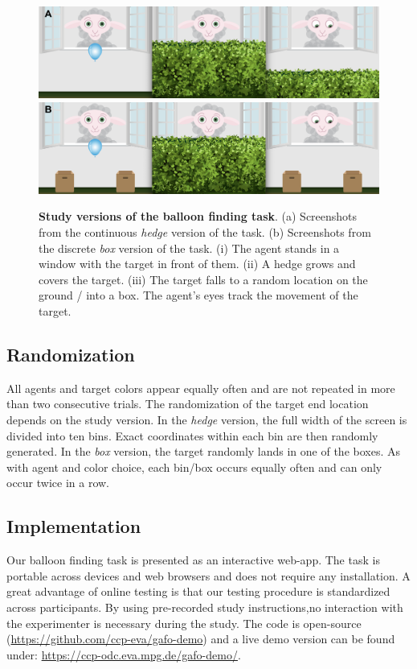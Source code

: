 \documentclass[
  english,
  man,floatsintext]{apa6}
\begin{document}
\begin{figure}
\includegraphics[width=1\linewidth]{../figures/gafo_hedge} \includegraphics[width=1\linewidth]{../figures/gafo_boxes} \caption{\textbf{Study versions of the balloon finding task}. (a) Screenshots from the continuous \emph{hedge} version of the task. (b) Screenshots from the discrete \emph{box} version of the task. (i) The agent stands in a window with the target in front of them. (ii) A hedge grows and covers the target. (iii) The target falls to a random location on the ground / into a box. The agent's eyes track the movement of the target.}\label{fig:fig1}
\end{figure}

\hypertarget{randomization}{%
\subsection{Randomization}\label{randomization}}

All agents and target colors appear equally often and are not repeated in more than two consecutive trials. The randomization of the target end location depends on the study version. In the \emph{hedge} version, the full width of the screen is divided into ten bins. Exact coordinates within each bin are then randomly generated. In the \emph{box} version, the target randomly lands in one of the boxes. As with agent and color choice, each bin/box occurs equally often and can only occur twice in a row.

\hypertarget{implementation}{%
\subsection{Implementation}\label{implementation}}

Our balloon finding task is presented as an interactive web-app. The task is portable across devices and web browsers and does not require any installation. A great advantage of online testing is that our testing procedure is standardized across participants. By using pre-recorded study instructions,no interaction with the experimenter is necessary during the study. The code is open-source (\url{https://github.com/ccp-eva/gafo-demo}) and a live demo version can be found under: \url{https://ccp-odc.eva.mpg.de/gafo-demo/}.
\end{document}
